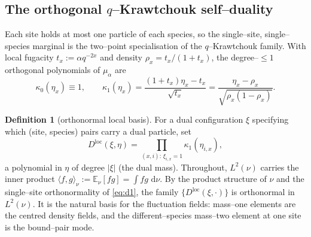 \documentclass[11pt]{article}
\theoremstyle{plain}
\theoremstyle{definition}
\newtheorem{definition}[theorem]{Definition}
\theoremstyle{remark}
\newcommand{\E}{\mathbb{E}}\newcommand{\PP}{\mathbb{P}}\newcommand{\dd}{\,\mathrm{d}}
\begin{document}
\subsection{The orthogonal \texorpdfstring{$q$}{q}--Krawtchouk self--duality}
Each site holds at most one particle of each species, so the single--site,
single--species marginal is the two--point specialisation of the $q$--Krawtchouk
family. With local fugacity $t_x:=\alpha q^{-2x}$ and density $\rho_x=t_x/(1+t_x)$,
the degree--$\le1$ orthogonal polynomials of $\mu_\alpha$ are
\begin{equation}\label{eq:d1}
  \kappa_0(\eta_x)\equiv1,\qquad
  \kappa_1(\eta_x)=\frac{(1+t_x)\eta_x-t_x}{\sqrt{t_x}}
  =\frac{\eta_x-\rho_x}{\sqrt{\rho_x(1-\rho_x)}}.
\end{equation}

\begin{definition}[orthonormal local basis]\label{def:D}
For a dual configuration $\xi$ specifying which (site, species) pairs carry a dual
particle, set
\begin{equation}\label{eq:Dfac}
  D^{\mathrm{loc}}(\xi,\eta)=\prod_{(x,i):\,\xi_{i,x}=1}\kappa_1(\eta_{i,x}),
\end{equation}
a polynomial in $\eta$ of degree $|\xi|$ (the dual mass). Throughout, $L^2(\nu)$ carries
the inner product $\langle f,g\rangle_\nu:=\E_\nu[fg]=\int fg\,\dd\nu$. By the product
structure of $\nu$ and the single--site orthonormality of \eqref{eq:d1}, the family
$\{D^{\mathrm{loc}}(\xi,\cdot)\}$ is orthonormal in $L^2(\nu)$. It is the natural
basis for the fluctuation fields: mass--one elements are the centred density fields,
and the different--species mass--two element at one site is the bound--pair mode.
\end{definition}
\end{document}
